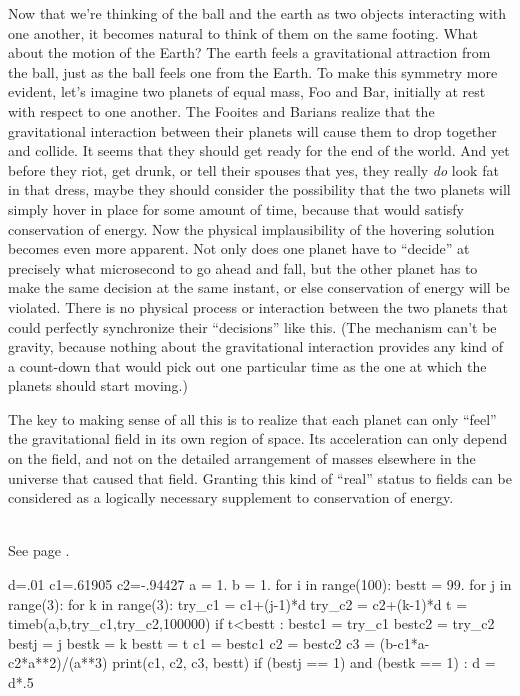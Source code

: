 Now that we're thinking of the ball and the earth as two objects interacting with one another, it becomes
natural to think of them on the same footing. What about the motion of the Earth? The earth feels a gravitational
attraction from the ball, just as the ball feels one from the Earth. To make this symmetry more evident, let's
imagine two planets of equal mass, Foo and Bar, initially at rest with respect to one another.
The Fooites and Barians realize that the gravitational interaction between their planets will cause them to drop
together and collide. It seems that they should get ready for the end of the world. And yet before they
riot, get drunk, or tell their spouses that yes, they really \emph{do} look fat in that dress, maybe they
should consider the possibility that the two planets will simply hover in place for some amount of time,
because that would satisfy
conservation of energy. Now the physical implausibility of the hovering solution becomes even more
apparent. Not only does one planet have to ``decide'' at precisely what microsecond to go ahead and fall, but
the other planet has to make the same decision at the same instant, or else conservation of energy will
be violated. There is no physical process or interaction between the two planets that could perfectly
synchronize their ``decisions'' like this. (The mechanism can't be gravity, because nothing about the
gravitational interaction provides any kind of a count-down that would pick out one particular time as the
one at which the planets should start moving.)

The key to making sense of all this is to realize that each planet can only ``feel'' the gravitational
field in its own region of space. Its acceleration can only depend on the field, and not on the
detailed arrangement of masses elsewhere in the universe that caused that field. Granting this
kind of ``real'' status to fields can be considered as a logically necessary supplement to conservation
of energy.

\noindent{}\\
See page \pageref{brachrefback}\label{brachsearchcode}.
\begin{listing}{1}
d=.01
c1=.61905
c2=-.94427
a = 1.
b = 1.
for i in range(100):
  bestt = 99.
  for j in range(3):
    for k in range(3):
      try_c1 = c1+(j-1)*d
      try_c2 = c2+(k-1)*d
      t = timeb(a,b,try_c1,try_c2,100000)
      if t<bestt :
        bestc1 = try_c1
        bestc2 = try_c2
        bestj = j
        bestk = k
        bestt = t
  c1 = bestc1
  c2 = bestc2
  c3 = (b-c1*a-c2*a**2)/(a**3)
  print(c1, c2, c3, bestt)
  if (bestj == 1) and (bestk == 1) :
    d = d*.5
\end{listing}

